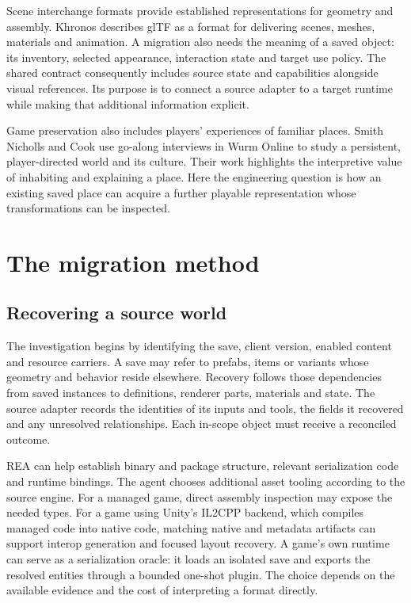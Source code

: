 \documentclass[11pt]{article}
\begin{document}
Scene interchange formats provide established representations for geometry and
assembly. Khronos describes glTF as a format for delivering scenes, meshes,
materials and animation.\cite{gltfrelease} A migration also needs the meaning of a
saved object: its inventory, selected appearance, interaction state and target
use policy. The shared contract consequently includes source state and
capabilities alongside visual references. Its purpose is to connect a source
adapter to a target runtime while making that additional information explicit.

Game preservation also includes players' experiences of familiar places. Smith
Nicholls and Cook use go-along interviews in Wurm Online to study a persistent,
player-directed world and its culture.\cite{wurm} Their work highlights the
interpretive value of inhabiting and explaining a place. Here the engineering
question is how an existing saved place can acquire a further playable
representation whose transformations can be inspected.

\section{The migration method}

\subsection{Recovering a source world}

The investigation begins by identifying the save, client version, enabled
content and resource carriers. A save may refer to prefabs, items or variants
whose geometry and behavior reside elsewhere. Recovery follows those
dependencies from saved instances to definitions, renderer parts, materials and
state. The source adapter records the identities of its inputs and tools, the
fields it recovered and any unresolved relationships. Each in-scope object must
receive a reconciled outcome.

REA can help establish binary and package structure, relevant serialization code
and runtime bindings. The agent chooses additional asset tooling according to
the source engine. For a managed game, direct assembly inspection may expose the
needed types. For a game using Unity's IL2CPP backend, which compiles managed
code into native code, matching native and metadata artifacts can
support interop generation and focused layout recovery. A game's own runtime
can serve as a serialization oracle: it loads an isolated save and exports the
resolved entities through a bounded one-shot plugin. The choice depends on the
available evidence and the cost of interpreting a format directly.
\end{document}
